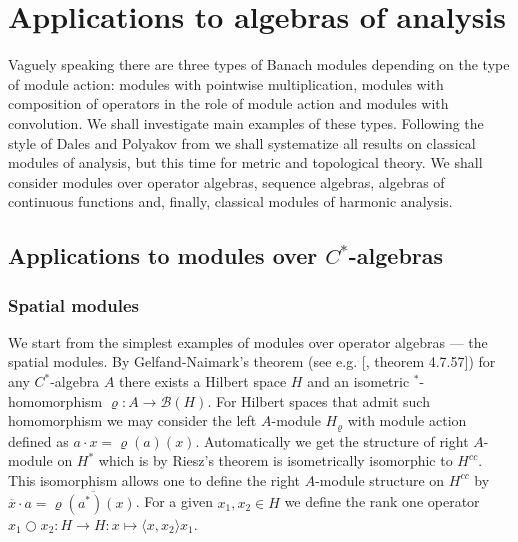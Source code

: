 
\chapter{Applications to algebras of analysis} %

\label{ChapterApplicationsToAlgebrasOfAnalysis} %


Vaguely speaking there are three types of Banach modules depending on the type of module action: modules with pointwise multiplication, modules with composition of operators in the role of module action and modules with convolution. We shall investigate main examples of these types. Following the style of Dales and Polyakov from \cite{DalPolHomolPropGrAlg} we shall systematize all results on classical modules of analysis, but this time for metric and topological theory. We shall consider modules over operator algebras, sequence algebras, algebras of continuous functions and, finally, classical modules of harmonic analysis.




\section{Applications to modules over \texorpdfstring{$C^*$}{C*}-algebras}
\label{SectionApplicationsToModulesOverCStarAlgebras}


\subsection{Spatial modules}
\label{SubSectionSpatialModules}

We start from the simplest  examples of modules over operator algebras --- the spatial modules. By Gelfand-Naimark's theorem (see e.g. [\cite{HelBanLocConvAlg}, theorem 4.7.57]) for any $C^*$-algebra $A$ there exists a Hilbert space $H$ and an isometric ${}^*$-homomorphism $\varrho:A\to\mathcal{B}(H)$. For Hilbert spaces that admit such homomorphism we may consider the left $A$-module $H_\varrho$ with module action defined as $a\cdot x=\varrho(a)(x)$. Automatically we get the structure of right $A$-module on $H^*$ which is by Riesz's theorem is isometrically isomorphic to $H^{cc}$. This isomorphism allows one to define the right $A$-module structure on $H^{cc}$ by $\overline{x}\cdot a=\overline{\varrho(a^*)(x)}$. For a given $x_1,x_2\in H$ we define the rank one operator $x_1\bigcirc x_2:H\to H:x\mapsto \langle x, x_2\rangle x_1$. 

